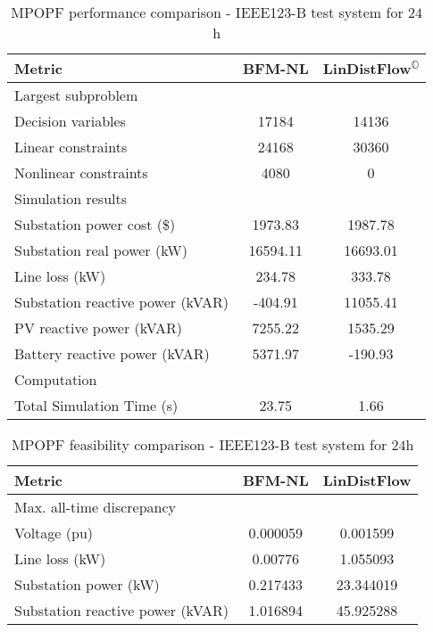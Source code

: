 \documentclass[../../outputs/main.tex]{subfiles}
\begin{document}
\begin{table}[t] %
    \centering
    \caption{MPOPF performance comparison - IEEE123-B test system for $24$h}
    \begin{tabular}{|l|c|c|}
    \hline
    \textbf{Metric} & \textbf{BFM-NL} & \textbf{LinDistFlow\textsuperscript{\(\mathbb{O}\)}} \\ \hline
    Largest subproblem & \multicolumn{2}{c|}{} \\ \hline
    \quad Decision variables & {17184} & {14136} \\ \hline
    \quad Linear constraints & {24168} & {30360} \\ \hline
    \quad Nonlinear constraints & {4080} & {0} \\ \hline
    Simulation results  & \multicolumn{2}{c|}{} \\ \hline
    \quad Substation power cost (\$) & 1973.83 & 1987.78 \\ \hline
    \quad Substation real power (kW) & 16594.11 & 16693.01 \\ \hline
    \quad Line loss (kW) & 234.78 & 333.78 \\ \hline
    \quad Substation reactive power (kVAR) & -404.91 & 11055.41 \\ \hline
    \quad PV reactive power (kVAR) & 7255.22 & 1535.29 \\ \hline
    \quad Battery reactive power (kVAR) & 5371.97 & -190.93 \\ \hline
    Computation  & \multicolumn{2}{c|}{} \\ \hline
    \quad Total Simulation Time (s) & 23.75 & 1.66 \\ \hline
    \end{tabular}
    \label{table:opt-5-20-30}
    \vspace{-3mm}
\end{table}

\begin{table}[t]
    \centering
    \caption{MPOPF feasibility comparison - IEEE123-B test system for $24$h}
    \begin{tabular}{|l|c|c|}
    \hline
    \textbf{Metric} & \textbf{BFM-NL} & \textbf{LinDistFlow} \\ \hline
    Max. all-time discrepancy & \multicolumn{2}{c|}{} \\ \hline
    \quad Voltage (pu) & 0.000059 & 0.001599 \\ \hline
    \quad Line loss (kW) & 0.00776 & 1.055093 \\ \hline
    \quad Substation power (kW) & 0.217433 & 23.344019 \\ \hline
    \quad Substation reactive power (kVAR) & 1.016894 & 45.925288 \\ \hline
    \end{tabular}
    \label{table:feas-ieee123B-24h}
    \vspace{-3mm}
\end{table}
\end{document}
